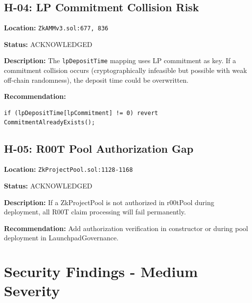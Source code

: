 \documentclass[11pt,a4paper]{article}
\begin{document}
\vspace{1em}

\begin{highbox}
\subsection{H-04: LP Commitment Collision Risk}
\end{highbox}

\textbf{Location:} \texttt{ZkAMMv3.sol:677, 836}

\textbf{Status:} \colorbox{medium!30}{ACKNOWLEDGED}

\textbf{Description:}
The \texttt{lpDepositTime} mapping uses LP commitment as key. If a commitment collision occurs (cryptographically infeasible but possible with weak off-chain randomness), the deposit time could be overwritten.

\textbf{Recommendation:}
\begin{lstlisting}
if (lpDepositTime[lpCommitment] != 0) revert CommitmentAlreadyExists();
\end{lstlisting}

\vspace{1em}

\begin{highbox}
\subsection{H-05: R00T Pool Authorization Gap}
\end{highbox}

\textbf{Location:} \texttt{ZkProjectPool.sol:1128-1168}

\textbf{Status:} \colorbox{medium!30}{ACKNOWLEDGED}

\textbf{Description:}
If a ZkProjectPool is not authorized in r00tPool during deployment, all R00T claim processing will fail permanently.

\textbf{Recommendation:}
Add authorization verification in constructor or during pool deployment in LaunchpadGovernance.

\newpage

\section{Security Findings - Medium Severity}
\end{document}
